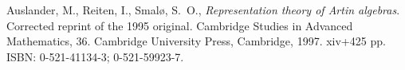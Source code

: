 \documentclass{amsart}
\numberwithin{equation}{section}
\theoremstyle{definition}
\begin{document}
\printindex
\begin{thebibliography}{ARS}
 Auslander, M., Reiten, I., Smal\o, S.\ O.,
  \emph{Representation theory of Artin algebras}. Corrected reprint of
  the 1995 original. Cambridge Studies in Advanced Mathematics,
  36. Cambridge University Press, Cambridge, 1997. xiv+425 pp. ISBN:
  0-521-41134-3; 0-521-59923-7.
\end{thebibliography}
\end{document}
